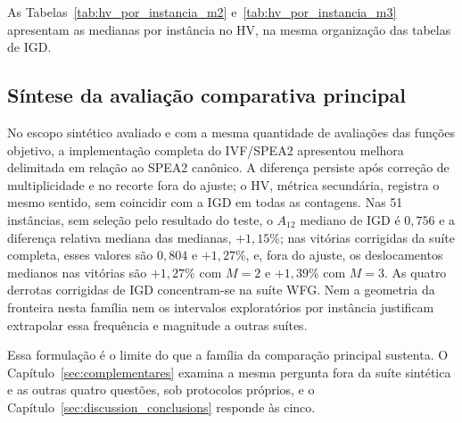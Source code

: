 As Tabelas~\ref{tab:hv_por_instancia_m2} e~\ref{tab:hv_por_instancia_m3} apresentam as medianas por instância no HV, na mesma organização das tabelas de IGD.





\FloatBarrier

\subsection{Síntese da avaliação comparativa principal}
\label{sec:sintese_resultados}

No escopo sintético avaliado e com a mesma quantidade de avaliações das funções objetivo, a implementação completa do IVF/SPEA2 apresentou melhora delimitada em relação ao SPEA2 canônico. A diferença persiste após correção de multiplicidade e no recorte fora do ajuste; o HV, métrica secundária, registra o mesmo sentido, sem coincidir com a IGD em todas as contagens. Nas 51 instâncias, sem seleção pelo resultado do teste, o $A_{12}$ mediano de IGD é $0{,}756$ e a diferença relativa mediana das medianas, $+1{,}15\%$; nas vitórias corrigidas da suíte completa, esses valores são $0{,}804$ e $+1{,}27\%$, e, fora do ajuste, os deslocamentos medianos nas vitórias são $+1{,}27\%$ com $M=2$ e $+1{,}39\%$ com $M=3$. As quatro derrotas corrigidas de IGD concentram-se na suíte WFG. Nem a geometria da fronteira nesta família nem os intervalos exploratórios por instância justificam extrapolar essa frequência e magnitude a outras suítes.

Essa formulação é o limite do que a família da comparação principal sustenta. O Capítulo~\ref{sec:complementares} examina a mesma pergunta fora da suíte sintética e as outras quatro questões, sob protocolos próprios, e o Capítulo~\ref{sec:discussion_conclusions} responde às cinco.
